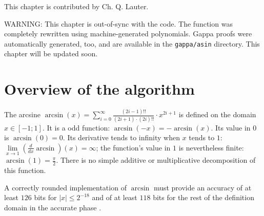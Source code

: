This chapter is contributed by Ch. Q. Lauter.

WARNING: This chapter is out-of-sync with the code. The function was
completely rewritten using machine-generated polynomials. Gappa proofs
were automatically generated, too, and are available in the
\texttt{gappa/asin} directory. This chapter will be updated soon.

\section{Overview of the algorithm\label{sec:asin-overview}}
The arcsine $\arcsin\left( x \right) = \sum\limits_{i=0}^{\infty}
\frac{\left( 2i - 1 \right)!!}{\left(2i+1\right) \cdot \left( 2i
\right)!!} \cdot x^{2i+1}$ is defined on the domain $x \in \left[ -1;
1 \right]$. It is a odd function: $\arcsin\left(-x\right) =
-\arcsin\left( x \right)$. Its value in $0$ is $\arcsin\left( 0
\right) = 0$. Its derivative tends to infinity when $x$ tends to $1$:
$\lim\limits_{x \rightarrow 1} \left( \frac{d}{dx} \arcsin
\right)\left(x\right) = \infty$; the function's value in $1$ is
nevertheless finite: $\arcsin\left( 1 \right) = \frac{\pi}{2}$.  There
is no simple additive or multiplicative decomposition of this
function.

A correctly rounded implementation of $\arcsin$ must provide an
accuracy of at least $126$ bits for $\left \vert x \right \vert \leq
2^{-18}$ and of at least $118$ bits for the rest of the definition
domain in the accurate phase \cite{DinDefLau2004LIP}.

